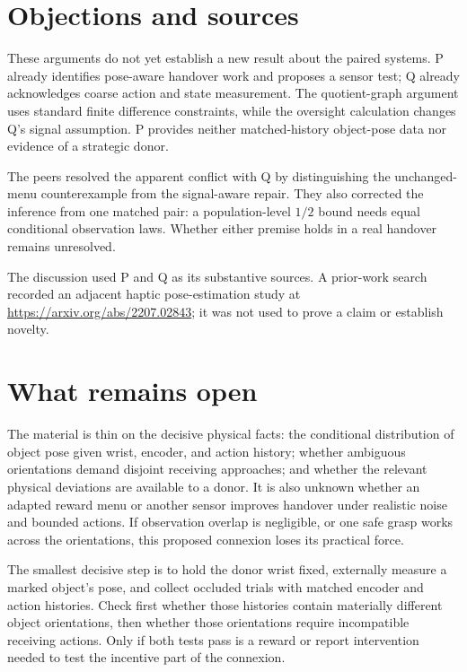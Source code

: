 \documentclass{article}
\begin{document}
\section{Objections and sources}

\begin{objection}
These arguments do not yet establish a new result about the paired systems. P already identifies pose-aware handover work and proposes a sensor test; Q already acknowledges coarse action and state measurement. The quotient-graph argument uses standard finite difference constraints, while the oversight calculation changes Q's signal assumption. P provides neither matched-history object-pose data nor evidence of a strategic donor. 
\end{objection}

The peers resolved the apparent conflict with Q by distinguishing the unchanged-menu counterexample from the signal-aware repair. They also corrected the inference from one matched pair: a population-level \(1/2\) bound needs equal conditional observation laws. Whether either premise holds in a real handover remains unresolved. 

The discussion used P and Q as its substantive sources. A prior-work search recorded an adjacent haptic pose-estimation study at \url{https://arxiv.org/abs/2207.02843}; it was not used to prove a claim or establish novelty. 

\section{What remains open}

The material is thin on the decisive physical facts: the conditional distribution of object pose given wrist, encoder, and action history; whether ambiguous orientations demand disjoint receiving approaches; and whether the relevant physical deviations are available to a donor. It is also unknown whether an adapted reward menu or another sensor improves handover under realistic noise and bounded actions. If observation overlap is negligible, or one safe grasp works across the orientations, this proposed connexion loses its practical force. 

The smallest decisive step is to hold the donor wrist fixed, externally measure a marked object's pose, and collect occluded trials with matched encoder and action histories. Check first whether those histories contain materially different object orientations, then whether those orientations require incompatible receiving actions. Only if both tests pass is a reward or report intervention needed to test the incentive part of the connexion. 
\end{document}
